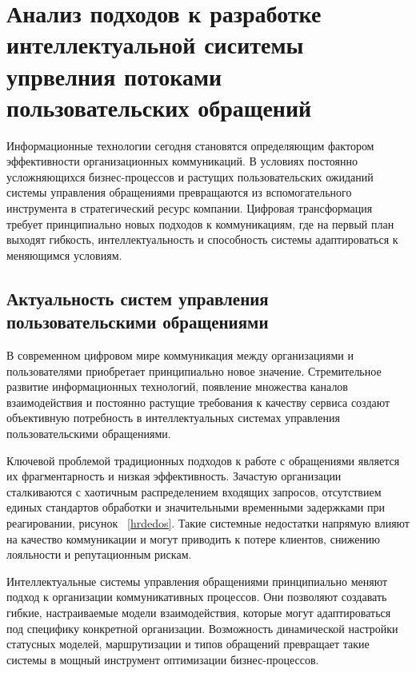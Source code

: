 \section{Анализ подходов к разработке интеллектуальной сиситемы упрвелния потоками пользовательских обращений}
\label{sec:analysis}

Информационные технологии сегодня становятся определяющим фактором эффективности организационных коммуникаций. В условиях постоянно усложняющихся бизнес-процессов и растущих пользовательских ожиданий системы управления обращениями превращаются из вспомогательного инструмента в стратегический ресурс компании. Цифровая трансформация требует принципиально новых подходов к коммуникациям, где на первый план выходят гибкость, интеллектуальность и способность системы адаптироваться к меняющимся условиям.

\subsection{Актуальность систем управления пользовательскими обращениями}

В современном цифровом мире коммуникация между организациями и пользователями приобретает принципиально новое значение. Стремительное развитие информационных технологий, появление множества каналов взаимодействия и постоянно растущие требования к качеству сервиса создают объективную потребность в интеллектуальных системах управления пользовательскими обращениями.

Ключевой проблемой традиционных подходов к работе с обращениями является их фрагментарность и низкая эффективность. Зачастую организации сталкиваются с хаотичным распределением входящих запросов, отсутствием единых стандартов обработки и значительными временными задержками при реагировании, рисунок ~\ref{hrdedos}. Такие системные недостатки напрямую влияют на качество коммуникации и могут приводить к потере клиентов, снижению лояльности и репутационным рискам.


Интеллектуальные системы управления обращениями принципиально меняют подход к организации коммуникативных процессов. Они позволяют создавать гибкие, настраиваемые модели взаимодействия, которые могут адаптироваться под специфику конкретной организации. Возможность динамической настройки статусных моделей, маршрутизации и типов обращений превращает такие системы в мощный инструмент оптимизации бизнес-процессов.

